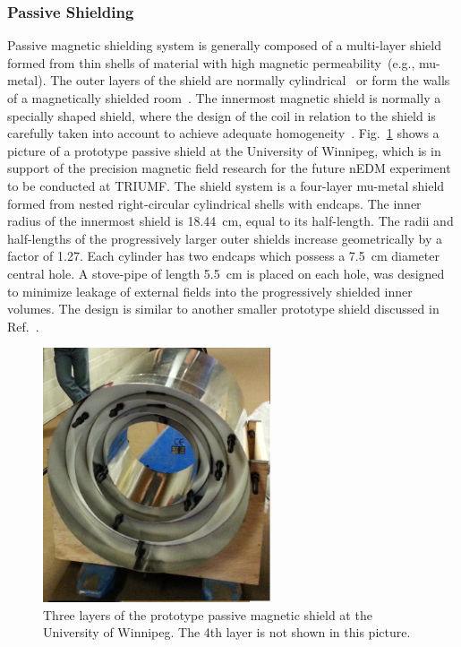 \subsubsection{Passive Shielding}


Passive magnetic shielding system is generally composed of a multi-layer
shield formed from thin shells of material with high magnetic
permeability~(e.g., mu-metal).  The outer layers of the shield are
normally cylindrical~\cite{serebrov2014new,baker2011search} or form
the walls of a magnetically shielded
room~\cite{altarev2014magnetically,altarev2015minimizing}.  The
innermost magnetic shield is normally a specially shaped shield, where
the design of the coil in relation to the shield is carefully taken
into account to achieve adequate
homogeneity~\cite{Baker2006,Kirch_talk,altarev2012next}. Fig.~\ref{fig:prototype_shields}
shows a picture of a prototype passive shield at the University of
Winnipeg, which is in support of the precision magnetic field research
for the future nEDM experiment to be conducted at TRIUMF.  The shield
system is a four-layer mu-metal shield formed from nested
right-circular cylindrical shells with endcaps.  The inner radius of
the innermost shield is 18.44~cm, equal to its half-length. The radii
and half-lengths of the progressively larger outer shields increase
geometrically by a factor of 1.27.  Each cylinder has two endcaps
which possess a 7.5~cm diameter central hole.  A stove-pipe of length
5.5~cm is placed on each hole, was designed to minimize leakage of
external fields into the progressively shielded inner volumes.  The
design is similar to another smaller prototype shield discussed in
Ref.~\cite{martin2015large}.

\begin{figure}[h!]
  \centering
  \includegraphics[width=0.6\textwidth]{prototype_shields.png}
  \caption{ Three layers of the prototype passive magnetic shield at
    the University of Winnipeg. The 4th layer is not shown in this
    picture.}
  \label{fig:prototype_shields}
\end{figure}


